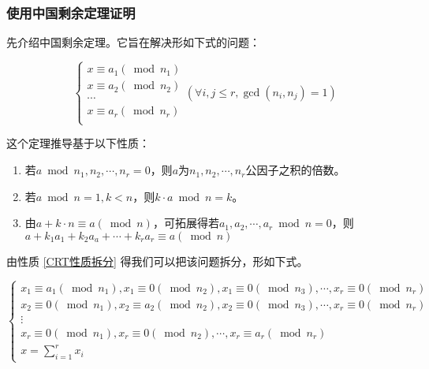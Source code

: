 \documentclass[a4paper]{article}         %
\begin{document}
\subsubsection{使用中国剩余定理证明}

先介绍中国剩余定理。它旨在解决形如下式的问题：

\begin{equation}
    \label{中国剩余定理问题方程组}
	\begin{cases}
		x \equiv a_1(\bmod n_1) \\
		x \equiv a_2(\bmod n_2) \\
		\cdots                  \\
		x \equiv a_r(\bmod n_r) \\
	\end{cases}
    (\forall i, j \leqslant r, \gcd(n_i, n_j) = 1)
\end{equation}

这个定理推导基于以下性质：

\begin{enumerate}
	\item \label{CRT性质找数} 若$a \bmod n_1,n_2, \cdots, n_r = 0$，则$a$为$n_1,n_2, \cdots, n_r$公因子之积的倍数。
	\item \label{CRT性质倍数} 若$a \bmod n = 1, k < n$，则$ k \cdot a \bmod n = k$。
	\item \label{CRT性质拆分} 由$a + k \cdot n \equiv a(\bmod n)$，可拓展得若$a_1,a_2,\cdots,a_r \bmod n = 0$，则$a + k_1a_1+k_2a_a+\cdots+k_ra_r \equiv a (\bmod n)$ %
\end{enumerate}

由性质 \ref{CRT性质拆分} 得我们可以把该问题拆分，形如下式。

\[
	\begin{cases}
		x_1 \equiv a_1(\bmod n_1), x_1 \equiv 0 (\bmod n_2), x_1 \equiv 0 (\bmod n_3), \cdots, x_r \equiv 0 (\bmod n_r)\\
		x_2 \equiv 0(\bmod n_1), x_2 \equiv a_2 (\bmod n_2), x_2 \equiv 0 (\bmod n_3), \cdots, x_r \equiv 0 (\bmod n_r)\\
		\vdots\\
		x_r \equiv 0(\bmod n_1), x_r \equiv 0 (\bmod n_2), \cdots, x_r \equiv a_r (\bmod n_r)\\
		x = \sum \limits_{i=1}^{r} x_i
	\end{cases}
\]
\end{document}
